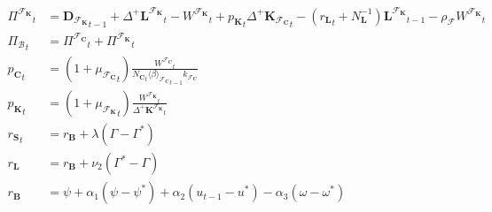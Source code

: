 \documentclass[a4paper, headings=standardclasses]{scrartcl}
\numberwithin{equation}{subsection}
\begin{document}
{\begin{align}
		{\Pi^{\mathcal{F}_\mathbf{K}}}_t                  & =  {\mathbf{D}_{\mathcal{F}_\mathbf{K}}}_{t-1} + {\Delta^+{\mathbf{L}^{\mathcal{F}_\mathbf{K}}}}_t - {W^{\mathcal{F}_\mathbf{K}}}_t +  {p_{\mathbf{K}}}_t {\Delta^+{\mathbf{K}_{\mathcal{F}_\mathbf{C}}}}_t - ({r_\mathbf{L}}                                                                                                                                                                                                                                                                       _t + N_\mathbf{L}^{-1}) {\mathbf{L}^{\mathcal{F}_\mathbf{K}}}_{t-1} - \rho_\mathcal{F}{W^{\mathcal{F}_\mathbf{K}}}_t \\
		{\Pi_\mathcal{B}}_t                               & = {\Pi^{\mathcal{F}_\mathbf{C}}}_t + {\Pi^{\mathcal{F}_\mathbf{K}}}_t                                                                                                                                                                                                         \\
		{p_\mathbf{C}}_t                                  & = (1+{\mu_{\mathcal{F}_\mathbf{C}}}_t) \frac{{W^{\mathcal{F}_\mathbf{C}}}_t}{{N_\mathbf{C}}_t {\langle \beta \rangle_{\mathcal{F}_\mathbf{C}}}_{t-1} k_{\mathcal{F}_\mathbf{C}}}                                                                                                                                                 \\
		{p_\mathbf{K}}_t                                  & = (1+{\mu_{\mathcal{F}_\mathbf{K}}}_t) \frac{{W^{\mathcal{F}_\mathbf{K}}}_t}{{\Delta^+\mathbf{K}^{\mathcal{F}_\mathbf{K}}}_t}                                                                                                                                                 \\
		{r_\mathbf{S}}_t                                  & = {r_\mathbf{B}} + \lambda(\Gamma - \Gamma^*)                                                                                                                                                                                                                         \\
		{r_\mathbf{L}}                                  & = {r_\mathbf{B}} + \nu_2 (\Gamma^* - \Gamma)                                                                                                                                                                                                                          \\
		{r_\mathbf{B}}                                  & = \psi + \alpha_1 (\psi - \psi^*) + \alpha_2 (u_{t-1} - u^*) - \alpha_3 (\omega - \omega^*)                                                                                                                                                                 \\

\end{align}}
\end{document}
